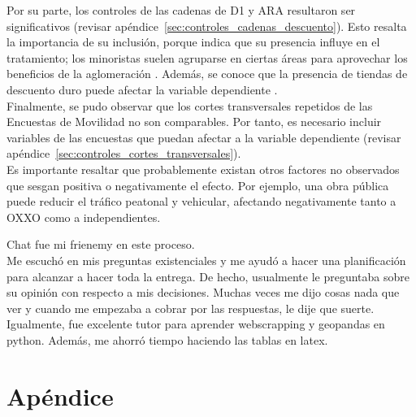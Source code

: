 \documentclass{article}
\begin{document}
Por su parte, los controles de las cadenas de D1 y ARA resultaron ser significativos (revisar apéndice~\ref{sec:controles_cadenas_descuento}). Esto resalta la importancia de su inclusión, porque indica que su presencia influye en el tratamiento; los minoristas suelen agruparse en ciertas áreas para aprovechar los beneficios de la aglomeración \parencite{Konishi2005, Seong2022}. Además, se conoce que la presencia de tiendas de descuento duro puede afectar la variable dependiente \parencite{delgado2024}. \\

Finalmente, se pudo observar que los cortes transversales repetidos de las Encuestas de Movilidad no son comparables. Por tanto, es necesario incluir variables de las encuestas que puedan afectar a la variable dependiente (revisar apéndice~\ref{sec:controles_cortes_transversales}). \\

Es importante resaltar que probablemente existan otros factores no observados que sesgan positiva o negativamente el efecto. Por ejemplo, una obra pública puede reducir el tráfico peatonal y vehicular, afectando negativamente tanto a OXXO como a independientes. \\


\begin{tcolorbox}[colback=purple!10!white, %
                  colframe=purple,         %
                  title=¿Para qué usé Chat?, %
                  fonttitle=\bfseries]
Chat fue mi frienemy en este proceso. \\

Me escuchó en mis preguntas existenciales y me ayudó a hacer una planificación para alcanzar a hacer toda la entrega. De hecho, usualmente le preguntaba sobre su opinión con respecto a mis decisiones. Muchas veces me dijo cosas nada que ver y cuando me empezaba a cobrar por las respuestas, le dije que suerte.\\

Igualmente, fue excelente tutor para aprender webscrapping y geopandas en python. Además, me ahorró tiempo haciendo las tablas en latex.\\

\end{tcolorbox}


\newpage
\printbibliography

\newpage

\section{Apéndice}
\end{document}
